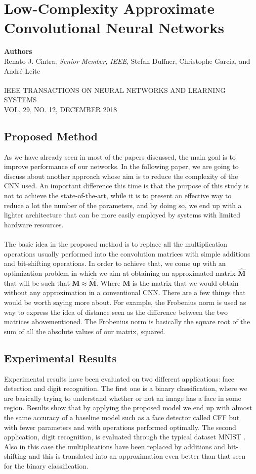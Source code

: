 \chapter{Low-Complexity Approximate Convolutional Neural Networks}

{\small \textbf{Authors}\\
Renato J. Cintra, \textit{Senior Member, IEEE}, Stefan Duffner, Christophe Garcia, and André Leite\\ \\
IEEE TRANSACTIONS ON NEURAL NETWORKS AND LEARNING SYSTEMS\\VOL. 29, NO. 12, DECEMBER 2018}

\section{Proposed Method}

As we have already seen in most of the papers discussed, the main goal is to improve performance of our networks. In the following paper, we are going to discuss about another approach whose aim is to reduce the complexity of the CNN used. An important difference this time is that the purpose of this study is not to achieve the state-of-the-art, while it is to present an effective way to reduce a lot the number of the parameters, and by doing so, we end up with a lighter architecture that can be more easily employed by systems with limited hardware resources.\\ \\
The basic idea in the proposed method is to replace all the multiplication operations usually performed into the convolution matrices with simple additions and bit-shifting operations. In order to achieve that, we come up with an optimization problem in which we aim at obtaining an approximated matrix $\hat{\textbf{M}}$ that will be such that $\textbf{M} \approx \hat{\textbf{M}}$. Where $\textbf{M}$ is the matrix that we would obtain without any approximation in a conventional CNN. There are a few things that would be worth saying more about. For example, the Frobenius norm is used as way to express the idea of distance seen as the difference between the two matrices abovementioned. The Frobenius norm is basically the square root of the sum of all the absolute values of our matrix, squared.

\section{Experimental Results}

Experimental results have been evaluated on two different applications: face detection and digit recognition. The first one is a binary classification, where we are basically trying to understand whether or not an image has a face in some region. Results show that by applying the proposed model we end up with almost the same accuracy of a baseline model such as a face detector called CFF but with fewer parameters and with operations performed optimally. The second application, digit recognition, is evaluated through the typical dataset MNIST \citep{MNIST}. Also in this case the multiplications have been replaced by additions and bit-shifting and this is translated into an approximation even better than that seen for the binary classification.
